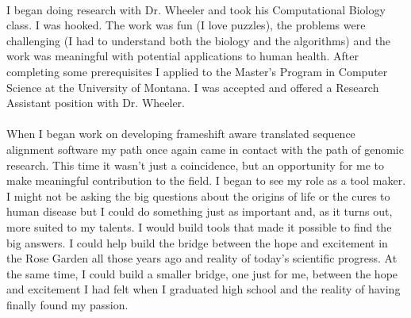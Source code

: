 \documentclass{article}
\begin{document}
\\
I began doing research with Dr. Wheeler and took his Computational Biology class. I was hooked.  The work was fun (I love puzzles), the problems were challenging (I had to understand both the biology and the algorithms) and the work was meaningful with potential applications to human health.  After completing some prerequisites I applied to the Master’s Program in Computer Science at the University of Montana.  I was accepted and offered a Research Assistant position with Dr. Wheeler.   \\
\\
When I began work on developing frameshift aware translated sequence alignment software my path once again came in contact with the path of genomic research.  This time it wasn’t just a coincidence, but an opportunity for me to make meaningful contribution to the field.   I began to see my role as a tool maker.  I might not be asking the big questions about the origins of life or the cures to human disease but I could do something just as important and, as it turns out, more suited to my talents.  I would build tools that made it possible to find the big answers.  I could help build the bridge between the hope and excitement in the Rose Garden all those years ago and reality of today’s scientific progress.  At the same time, I could build a smaller bridge, one just for me, between the hope and excitement I had felt when I graduated high school and the reality of having finally found my passion. \\
\end{document}

